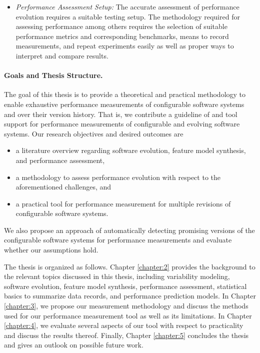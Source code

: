 \begin{itemize}
\item \emph{Performance Assessment Setup:} The accurate assessment of
performance evolution requires a suitable testing setup. The methodology required for assessing performance
among others requires the selection of suitable performance metrics and
corresponding benchmarks, means to record measurements, and repeat experiments
easily as well as proper ways to interpret and compare results.
\end{itemize}

\paragraph{Goals and Thesis Structure.}
The goal of this thesis is to provide a theoretical and practical methodology to enable
exhaustive performance measurements of configurable software systems and over
their version history. That is, we contribute a guideline of and tool support
for performance measurements of configurable and evolving software systems. Our
research objectives and desired outcomes are

\begin{itemize}
\item a literature overview regarding software evolution, feature model
synthesis, and performance assessment,
\item a methodology to assess performance evolution with respect to the
aforementioned challenges, and
\item a practical tool for performance measurement for multiple revisions of
configurable software systems.
\end{itemize}

We also propose an approach of automatically detecting promising versions of the
configurable software systems for performance measurements and evaluate whether
our assumptions hold. 

{
\color{red}
The thesis is organized as follows. Chapter
\ref{chapter:2} provides the background to the relevant topics discussed in this thesis, including variability modeling, software evolution, feature model synthesis, performance
assessment, statistical basics to summarize data records, and performance
prediction models.
In Chapter \ref{chapter:3}, we propose our measurement methodology and discuss
the methods used for our performance measurement tool as well as its
limitations. In Chapter \ref{chapter:4}, we evaluate several aspects of our
tool with respect to practicality and discuss the results thereof. Finally,
Chapter \ref{chapter:5} concludes the thesis and gives an outlook on possible
future work.
}

